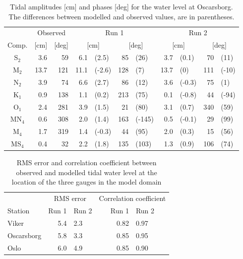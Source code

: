 \begin{table}[ht]
\caption{Tidal amplitudes [cm] and phases [deg] for the water level at Oscarsborg. The differences between modelled and observed values, are in parentheses.}
\label{tab:Oscarsborg}
\centering
\begin{tabular}{crrr@{ }lr@{ }lr@{ }lr@{ }l} \hline
      & \multicolumn{2}{c}{Observed} & \multicolumn{4}{c}{Run 1} & \multicolumn{4}{c}{Run 2}  \\
Comp. &  [cm] & [deg] & \multicolumn{2}{c}{[cm]} & \multicolumn{2}{c}{[deg]} & \multicolumn{2}{c}{[cm]} & \multicolumn{2}{c}{[deg]} \\ \hline 
S$_2$  &   3.6 &  59  &   6.1 & (2.5)  &  85 & (26)   &  3.7 & (0.1)  &  70 & (11)  \\
M$_2$  &  13.7 & 121  &  11.1 & (-2.6) & 128 & (7)    & 13.7 & (0)    & 111 & (-10) \\
N$_2$  &   3.9 &  74  &   6.6 & (2.7)  &  86 & (12)   &  3.6 & (-0.3) &  75 & (1)   \\
K$_1$  &   0.9 & 138  &   1.1 & (0.2)  & 213 & (75)   &  0.1 & (-0.8) &  44 & (-94) \\
O$_1$  &   2.4 & 281  &   3.9 & (1.5)  &  21 & (80)   &  3.1 & (0.7)  & 340 & (59)  \\
MN$_4$ &   0.6 & 308  &   2.0 & (1.4)  & 163 & (-145) &  0.5 & (-0.1) &  29 & (99)  \\
M$_4$  &   1.7 & 319  &   1.4 & (-0.3) &  44 & (95)   &  2.0 & (0.3)  &  15 & (56)  \\
MS$_4$ &   0.4 &  32  &   2.2 & (1.8)  & 135 & (103)  &  1.3 & (0.9)  & 106 & (74)  \\ \hline 
\end{tabular}
\end{table}

\begin{table}[ht]
\caption{RMS error and correlation coefficient between observed and modelled  tidal water level at the location of the three gauges in the model domain}
\label{tab:RMS}
\centering
\begin{tabular}{lrlrl} \hline
 & \multicolumn{2}{c}{RMS error} & \multicolumn{2}{c}{Correlation coefficient} \\ 
Station & Run 1 & Run 2 & \hspace{0.5cm} Run 1 & Run 2 \\ \hline 
Viker      & 5.4 &   2.3 &  0.82  &  0.97 \\
Oscarsborg & 5.8 &   3.3 &  0.85  &  0.95 \\
Oslo       & 6.0 &   4.9 &  0.85  &  0.90 \\ \hline
\end{tabular}
\end{table}

